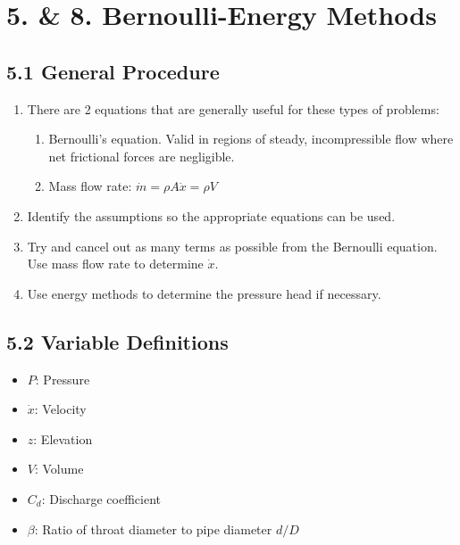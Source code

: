 \section*{5. \& 8. Bernoulli-Energy Methods}
\subsection*{5.1 General Procedure}
\begin{enumerate}
    \item There are 2 equations that are generally useful for these types of problems:
    \begin{enumerate}[label=\roman*)]
        \item Bernoulli's equation. Valid in regions of steady, incompressible 
        flow where net frictional forces are negligible.
        \item Mass flow rate: $\dot{m} = \rho A \dot{x} = \rho V$
    \end{enumerate}
    \item Identify the assumptions so the appropriate equations can be used.
    \item Try and cancel out as many terms as possible from the Bernoulli equation. Use mass flow rate to determine $\dot{x}$.
    \item Use energy methods to determine the pressure head if necessary.
\end{enumerate}
\subsection*{5.2 Variable Definitions}
\begin{itemize}
    \item $P$: Pressure
    \item $\dot{x}$: Velocity
    \item $z$: Elevation
    \item $V$: Volume
    \item $C_d$: Discharge coefficient
    \item $\beta$: Ratio of throat diameter to pipe diameter $d/D$
\end{itemize}
